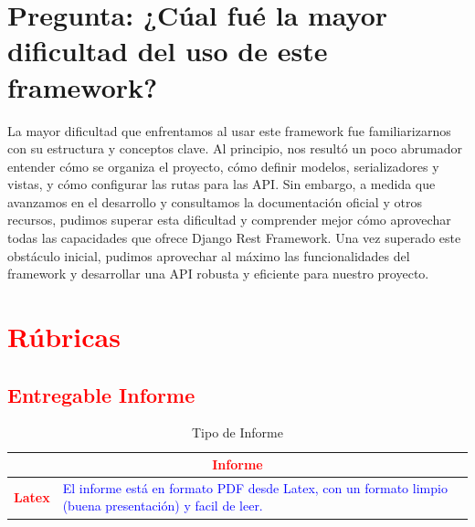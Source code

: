 \documentclass{article}
\begin{document}
\section{Pregunta: ¿Cúal fué la mayor dificultad del uso de este framework?}
La mayor dificultad que enfrentamos al usar este framework fue familiarizarnos con su estructura y conceptos clave. Al principio, nos resultó un poco abrumador entender cómo se organiza el proyecto, cómo definir modelos, serializadores y vistas, y cómo configurar las rutas para las API. Sin embargo, a medida que avanzamos en el desarrollo y consultamos la documentación oficial y otros recursos, pudimos superar esta dificultad y comprender mejor cómo aprovechar todas las capacidades que ofrece Django Rest Framework. Una vez superado este obstáculo inicial, pudimos aprovechar al máximo las funcionalidades del framework y desarrollar una API robusta y eficiente para nuestro proyecto.

\section{\textcolor{red}{Rúbricas}}
	
	\subsection{\textcolor{red}{Entregable Informe}}
	\begin{table}[H]
		\caption{Tipo de Informe}
		\setlength{\tabcolsep}{0.5em} %
		{\renewcommand{\arraystretch}{1.5}%
		\begin{tabular}{|p{3cm}|p{12cm}|}
			\hline
			\multicolumn{2}{|c|}{\textbf{\textcolor{red}{Informe}}}  \\
			\hline 
			\textbf{\textcolor{red}{Latex}} & \textcolor{blue}{El informe está en formato PDF desde Latex,  con un formato limpio (buena presentación) y facil de leer.}   \\ 
			\hline 
		\end{tabular}
	}
	\end{table}
	
	\clearpage
	
\end{document}
